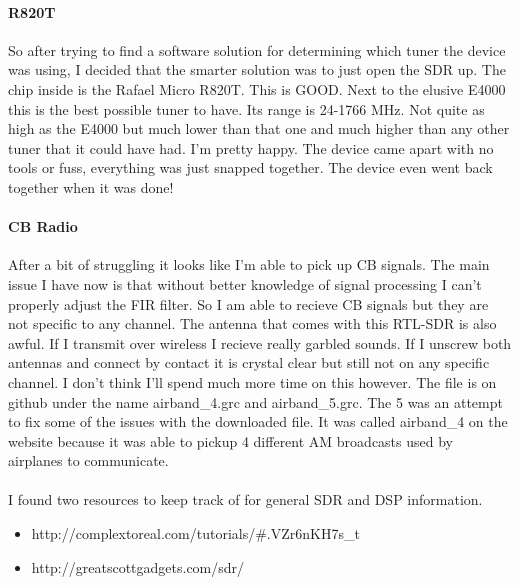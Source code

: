 \documentclass{article}
\begin{document}
	\paragraph{R820T} So after trying to find a software solution for determining which tuner the device was using, I decided 
	that the smarter solution was to just open the SDR up. The chip inside is the Rafael Micro R820T. This is GOOD. Next to the
	elusive E4000 this is the best possible tuner to have. Its range is 24-1766 MHz. Not quite as high as the E4000 but much
	lower than that one and much higher than any other tuner that it could have had. I'm pretty happy. The device came apart with
	no tools or fuss, everything was just snapped together. The device even went back together when it was done!
	\paragraph{CB Radio} After a bit of struggling it looks like I'm able to pick up CB signals. The main issue I have now
	is that without better knowledge of signal processing I can't properly adjust the FIR filter. So I am able to recieve
	CB signals but they are not specific to any channel. The antenna that comes with this RTL-SDR is also awful. If I
	transmit over wireless I recieve really garbled sounds. If I unscrew both antennas and connect by contact it is crystal
	clear but still not on any specific channel. I don't think I'll spend much more time on this however. The file is on github
	under the name airband\_4.grc and airband\_5.grc. The 5 was an attempt to fix some of the issues with the downloaded file.
	It was called airband\_4 on the website because it was able to pickup 4 different AM broadcasts used by airplanes to
	communicate. 
	\\\\
	I found two resources to keep track of for general SDR and DSP information.
	\begin{itemize}
		\item http://complextoreal.com/tutorials/\#.VZr6nKH7s\_t
		\item http://greatscottgadgets.com/sdr/
	\end{itemize}
	
	\newpage
\end{document}
